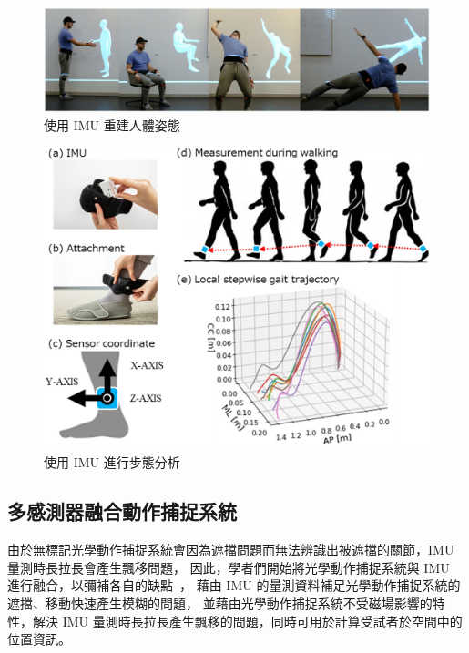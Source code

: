 \begin{figure}[!ht]
    \centering
    \includegraphics[width=\linewidth]{figure/ch2_fig_IMU_pose_estimate.png}
     \caption[使用 IMU 重建人體姿態]{使用 IMU 重建人體姿態}
     \label{ch2_fig_IMU_pose_estimate}
\end{figure}

\begin{figure}[!ht]
    \centering
    \includegraphics[width=\linewidth]{figure/ch2_fig_IMU_gait_estimate.png}
     \caption[使用 IMU 進行步態分析]{使用 IMU 進行步態分析}
     \label{ch2_fig_IMU_gait_estimate}
\end{figure}

\subsection{多感測器融合動作捕捉系統}
由於無標記光學動作捕捉系統會因為遮擋問題而無法辨識出被遮擋的關節，IMU 量測時長拉長會產生飄移問題，
因此，學者們開始將光學動作捕捉系統與 IMU 進行融合，以彌補各自的缺點~\cite{li2023visual}，
藉由 IMU 的量測資料補足光學動作捕捉系統的遮擋、移動快速產生模糊的問題，
並藉由光學動作捕捉系統不受磁場影響的特性，解決 IMU 量測時長拉長產生飄移的問題，同時可用於計算受試者於空間中的位置資訊。

